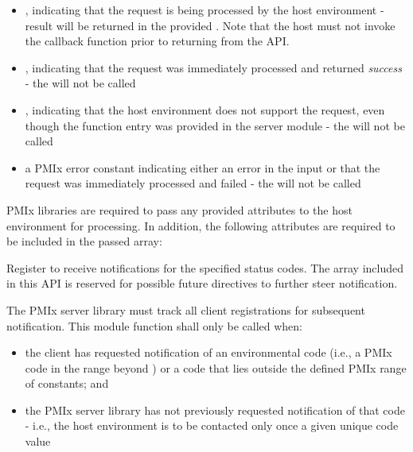 \begin{itemize}
    \item {}, indicating that the request is being processed by the host environment - result will be returned in the provided . Note that the host must not invoke the callback function prior to returning from the \ac{API}.
    \item {}, indicating that the request was immediately processed and returned \textit{success} - the  will not be called
    \item {}, indicating that the host environment does not support the request, even though the function entry was provided in the server module - the  will not be called
    \item a PMIx error constant indicating either an error in the input or that the request was immediately processed and failed - the  will not be called
\end{itemize}

\reqattrstart
\ac{PMIx} libraries are required to pass any provided attributes to the host environment for processing. In addition, the following attributes are required to be included in the passed  array:


\reqattrend

\descr

Register to receive notifications for the specified status codes. The  array included in this API is reserved for possible future directives to further steer notification.


\adviceimplstart
The \ac{PMIx} server library must track all client registrations for subsequent notification. This module function shall only be called when:

\begin{itemize}
    \item the client has requested notification of an environmental code (i.e., a \ac{PMIx} code in the range beyond ) or a code that lies outside the defined \ac{PMIx} range of constants; and
    \item the \ac{PMIx} server library has not previously requested notification of that code - i.e., the host environment is to be contacted only once a given unique code value
\end{itemize}

